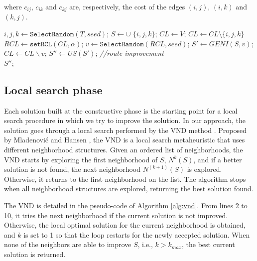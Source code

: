 \documentclass{ro}
\begin{document}
where $c_{ij}$, $c_{ik}$ and $c_{kj}$ are, respectively, the cost of the edges $(i,j)$, $(i,k)$ and $(k,j)$.

\begin{algorithm}[ht]
	\caption{\hspace{-1mm}: GENIUS($seed$,$\alpha$)}
	\label{alg:genius_PCCTP}
	\begin{algorithmic}[1]
		\STATE $i, j, k \gets \texttt{SelectRandom}(T,seed)$;
		\STATE $S \gets \cup$ $\{i, j, k\}$;
		\STATE $CL \gets V$;
		\STATE $CL \gets CL \setminus \{i,j,k\}$
		\STATE $RCL \gets \texttt{setRCL}(CL, \alpha)$;
		\STATE $v \gets \texttt{SelectRandom}(RCL,seed)$;
		\STATE $S' \gets GENI(S,v)$;
		\STATE $CL \gets CL \backslash {v} $;
		\ENDWHILE
		\STATE $S'' \gets US(S')$; \textit{//route improvement}\\
		\RETURN $S''$;
	\end{algorithmic}
\end{algorithm}



\subsection{Local search phase}

Each solution built at the constructive phase is the starting point for a local search procedure in which we try to
improve the solution. In our approach, the solution goes through a local search performed by the VND method \cite{mladenovic97}. Proposed by Mladenovi\'c and Hansen \cite{mladenovic97}, the VND is a local search metaheuristic that uses different neighborhood structures. Given an ordered list of neighborhoods, the VND starts by exploring the first neighborhood of $S$, $N^k(S)$, and if a better solution is not found, the next neighborhood $N^{(k + 1)} (S) $ is explored. Otherwise, it returns to the first neighborhood on the list. The algorithm stops when all neighborhood structures are explored, returning the best solution found. 


The VND is detailed in the pseudo-code of Algorithm \ref{alg:vnd}. From lines 2 to 10, it tries the next neighborhood if the current solution is not improved. Otherwise, the  local optimal solution for the current neighborhood is obtained, and $k$ is set to 1 so that the loop restarts for the newly accepted solution. When none of the neighbors are able to improve $S$, i.e., $k > k_{max}$, the best current solution is returned.
\end{document}
